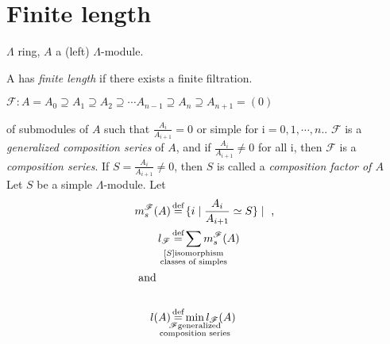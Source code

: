 \section{Finite length}
$\Lambda$ ring, $A$ a (left) $\Lambda$-module.
\begin{defin}
	A has \emph{finite length} if there exists a finite filtration.\\
	\begin{center}
			$\mathscr{F}\colon A = A_0 \supseteq A_1 \supseteq A_2 \supseteq \cdots A_{n-1} \supseteq A_{n} \supseteq A_{n+1} = (0) $\\
	\end{center}
of submodules of $A$ such that $\frac{A_i}{A_{i+1}} = 0$ or simple for i$=0,1,\cdots,n.$. 	$\mathscr{F}$ is a \emph{generalized composition series} of $A$, and if $\frac{A_i}{A_{i+1}} \ne 0$ for all i, then $\mathscr{F}$ is a \emph{composition series}. If $S=\frac{A_i}{A_{i+1}} \ne 0$, then $S$ is called a \emph{composition factor of $A$}\\

Let $S$ be a simple $\Lambda$-module. Let
\begin{align}
m_s^{\mathscr{F}}(A) & \defeq \{i \mid \frac{A_i}{A_{i+1}}\simeq S \}\mid \text{ , } \notag\\
l_{\mathscr{F}} & \defeq \sum_{\mathclap{\substack{\small[S]
      \text{isomorphism} \\ \small\text{classes of
        simples}}}}m_s^{\mathscr{F}}(A)\notag\\
\intertext{ and }\notag\\
l(A) & \defeq \min_{\mathclap{\substack{\mathscr{F} \text{generalized} \\ \text{composition series}}}} l_{\mathscr{F}}(A)\notag
\end{align}
\end{defin}

